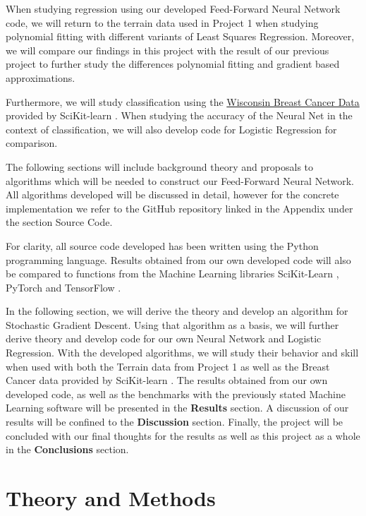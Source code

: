 \documentclass
[twocolumn,
secnumarabic,
nobibnotes,
aps,
prl,
reprint,
groupedaddress,
amsmath,
amssymb
]{revtex4-2}
\begin{document}
When studying regression using our developed Feed-Forward Neural Network code, we will return to the terrain data used in Project 1 when studying polynomial fitting with different variants of Least Squares Regression. Moreover, we will compare our findings in this project with the result of our previous project to further study the differences polynomial fitting and gradient based approximations.

Furthermore, we will study classification using the \href{https://www.kaggle.com/uciml/breast-cancer-wisconsin-data}{Wisconsin Breast Cancer Data} provided by SciKit-learn \cite{scikit-learn}. When studying the accuracy of the Neural Net in the context of classification, we will also develop code for Logistic Regression for comparison.

The following sections will include background theory and proposals to algorithms which will be needed to construct our Feed-Forward Neural Network. All algorithms developed will be discussed in detail, however for the concrete implementation we refer to the GitHub repository linked in the Appendix under the section Source Code.

For clarity, all source code developed has been written using the Python programming language. Results obtained from our own developed code will also be compared to functions from the Machine Learning libraries SciKit-Learn \cite{scikit-learn}, PyTorch \cite{paszke2019} and TensorFlow \cite{tensorflow2015-whitepaper}.

In the following section, we will derive the theory and develop an algorithm for Stochastic Gradient Descent. Using that algorithm as a basis, we will further derive theory and develop code for our own Neural Network and Logistic Regression. With the developed algorithms, we will study their behavior and skill when used with both the Terrain data from Project 1 as well as the Breast Cancer data provided by SciKit-learn \cite{scikit-learn}. The results obtained from our own developed code, as well as the benchmarks with the previously stated Machine Learning software will be presented in the \textbf{Results} section. A discussion of our results will be confined to the \textbf{Discussion} section. Finally, the project will be concluded with our final thoughts for the results as well as this project as a whole in the \textbf{Conclusions} section.

\section{Theory and Methods}
\end{document}
